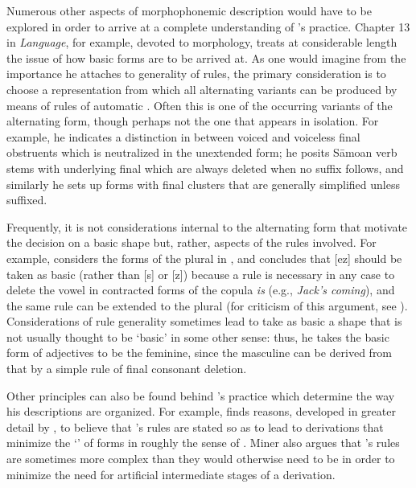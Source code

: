 Numerous other aspects of morphophonemic description would have to be
explored in order to arrive at a complete understanding of
{\Bloomfield}'s practice.  Chapter 13 in \textsl{Language}, for example,
devoted to morphology, treats at considerable length the issue of how
basic forms are to be arrived at. As one would imagine from the
importance he attaches to generality of rules, the primary
consideration is to choose a representation from which all alternating
variants can be produced by means of rules of automatic
. Often this is one of the occurring variants of the
alternating form, though perhaps not the one that appears in
isolation. For example, he indicates a distinction in  between
voiced and voiceless final obstruents which is neutralized in the
unextended form; he posits Sāmoan verb stems with underlying final
 which are always deleted when no suffix follows, and
similarly he sets up  forms with final clusters that are
generally simplified unless suffixed.

Frequently, it is not considerations internal to the alternating form
that motivate the decision on a basic shape but, rather, aspects of
the rules involved. For example, {\Bloomfield} considers the forms of the
 plural in , and concludes that [ez] should be taken as
basic (rather than [s] or [z]) because a rule is necessary in any case
to delete the vowel in contracted forms of the copula \emph{is} (e.g.,
\emph{Jack's coming}), and the same rule can be extended to the plural
(for criticism of this argument, see
\citealt{sra73:english-inflection}). Considerations of rule generality
sometimes lead {\Bloomfield} to take as basic a shape that is not usually
thought to be `basic' in some other sense: thus, he takes the basic
form of  adjectives to be the feminine, since the masculine can
be derived from that by a simple rule of final consonant deletion.

Other principles can also be found behind {\Bloomfield}'s practice which
determine the way his descriptions are organized. For example,
\citet{kenstowicz75:application} finds reasons, developed in greater
detail by \citet{miner81:bloomfield}, to believe that {\Bloomfield}'s
rules are stated so as to lead to derivations that minimize the
`' of forms in roughly the sense of
\citet{kiparsky:3dimensions}. Miner also argues that {\Bloomfield}'s
rules are sometimes more complex than they would otherwise need to be
in order to minimize the need for artificial intermediate stages of a
derivation.

